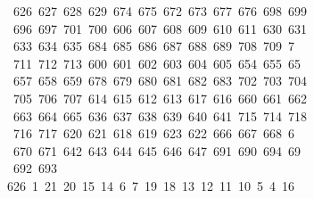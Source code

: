 \begin{tabbing}
\>\ 626\ 627\ 628\ 629\ 674\ 675\ 672\ 673\ 677\ 676\ 698\ 699\\[0pt]
\>\ 696\ 697\ 701\ 700\ 606\ 607\ 608\ 609\ 610\ 611\ 630\ 631\ \\[0pt]
\ 633\ 634\ 635\ 684\ 685\ 686\ 687\ 688\ 689\ 708\ 709\ 7\\[0pt]
\ 711\ 712\ 713\ 600\ 601\ 602\ 603\ 604\ 605\ 654\ 655\ 65\\[0pt]
\ 657\ 658\ 659\ 678\ 679\ 680\ 681\ 682\ 683\ 702\ 703\ 704\\[0pt]
\>\ 705\ 706\ 707\ 614\ 615\ 612\ 613\ 617\ 616\ 660\ 661\ 662\\[0pt]
\>\ 663\ 664\ 665\ 636\ 637\ 638\ 639\ 640\ 641\ 715\ 714\ 718\ \\[0pt]
\ 716\ 717\ 620\ 621\ 618\ 619\ 623\ 622\ 666\ 667\ 668\ 6\\[0pt]
\ 670\ 671\ 642\ 643\ 644\ 645\ 646\ 647\ 691\ 690\ 694\ 69\\[0pt]
\ 692\ 693\ \\[0pt]
626\ 1\ 21\ 20\ 15\ 14\ 6\ 7\ 19\ 18\ 13\ 12\ 11\ 10\ 5\ 4\ 16\\[0pt]

\end{tabbing}
